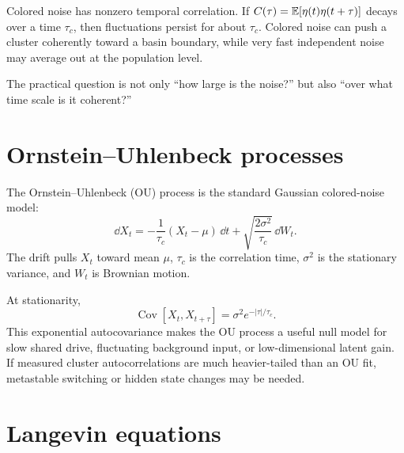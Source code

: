 Colored noise has nonzero temporal correlation. If $C(\tau)=\mathbb{E}[\eta(t)\eta(t+\tau)]$ decays over a time $\tau_c$, then fluctuations persist for about $\tau_c$. Colored noise can push a cluster coherently toward a basin boundary, while very fast independent noise may average out at the population level.

The practical question is not only ``how large is the noise?'' but also ``over what time scale is it coherent?''

\section{Ornstein--Uhlenbeck processes}
\label{sec:ou-processes}

The Ornstein--Uhlenbeck (OU) process is the standard Gaussian colored-noise model:
%
\begin{equation}
  \dd X_t =
  -\frac{1}{\tau_c}(X_t-\mu)\,\dd t
  + \sqrt{\frac{2\sigma^2}{\tau_c}}\,\dd W_t.
  \label{eq:ou-process}
\end{equation}
%
The drift pulls $X_t$ toward mean $\mu$, $\tau_c$ is the correlation time, $\sigma^2$ is the stationary variance, and $W_t$ is Brownian motion.

At stationarity,
%
\begin{equation}
  \operatorname{Cov}\!\left[X_t,X_{t+\tau}\right]
  = \sigma^2 e^{-|\tau|/\tau_c}.
  \label{eq:ou-autocovariance}
\end{equation}
%
This exponential autocovariance makes the OU process a useful null model for slow shared drive, fluctuating background input, or low-dimensional latent gain. If measured cluster autocorrelations are much heavier-tailed than an OU fit, metastable switching or hidden state changes may be needed.

\section{Langevin equations}
\label{sec:langevin-equations}

